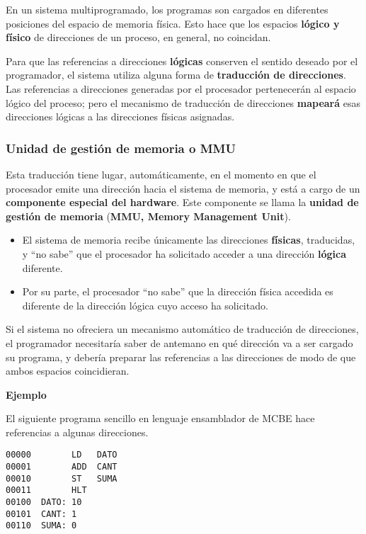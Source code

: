 \documentclass[spanish,a4paper,]{article}
\providecommand{\tightlist}{%
  \setlength{\itemsep}{0pt}\setlength{\parskip}{0pt}}
\begin{document}
En un sistema multiprogramado, los programas son cargados en diferentes
posiciones del espacio de memoria física. Esto hace que los espacios
\textbf{lógico y físico} de direcciones de un proceso, en general, no
coincidan.

Para que las referencias a direcciones \textbf{lógicas} conserven el
sentido deseado por el programador, el sistema utiliza alguna forma de
\textbf{traducción de direcciones}. Las referencias a direcciones
generadas por el procesador pertenecerán al espacio lógico del proceso;
pero el mecanismo de traducción de direcciones \textbf{mapeará} esas
direcciones lógicas a las direcciones físicas asignadas.

\hypertarget{unidad-de-gestiuxf3n-de-memoria-o-mmu}{%
\subsubsection{Unidad de gestión de memoria o
MMU}\label{unidad-de-gestiuxf3n-de-memoria-o-mmu}}

Esta traducción tiene lugar, automáticamente, en el momento en que el
procesador emite una dirección hacia el sistema de memoria, y está a
cargo de un \textbf{componente especial del hardware}. Este componente
se llama la \textbf{unidad de gestión de memoria} (\textbf{MMU, Memory
Management Unit}).

\begin{itemize}
\tightlist
\item
  El sistema de memoria recibe únicamente las direcciones
  \textbf{físicas}, traducidas, y ``no sabe'' que el procesador ha
  solicitado acceder a una dirección \textbf{lógica} diferente.
\item
  Por su parte, el procesador ``no sabe'' que la dirección física
  accedida es diferente de la dirección lógica cuyo acceso ha
  solicitado.
\end{itemize}

Si el sistema no ofreciera un mecanismo automático de traducción de
direcciones, el programador necesitaría saber de antemano en qué
dirección va a ser cargado su programa, y debería preparar las
referencias a las direcciones de modo de que ambos espacios
coincidieran.

\textbf{Ejemplo}

El siguiente programa sencillo en lenguaje ensamblador de MCBE hace
referencias a algunas direcciones.

\begin{verbatim}
00000        LD   DATO
00001        ADD  CANT
00010        ST   SUMA
00011        HLT
00100  DATO: 10
00101  CANT: 1
00110  SUMA: 0
\end{verbatim}
\end{document}
